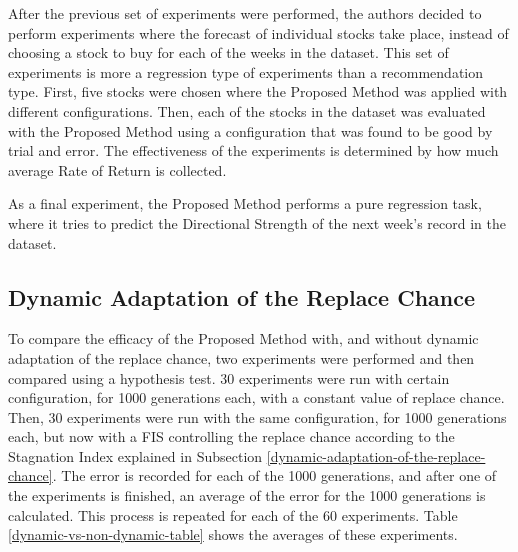 \documentclass[12pt,journal,draftcls,onecolumn]{IEEEtran}
\begin{document}
After the previous set of experiments were performed, the authors decided to perform experiments where the forecast of individual stocks take place, instead of choosing a stock to buy for each of the weeks in the dataset. This set of experiments is more a regression type of experiments than a recommendation type. First, five stocks were chosen where the Proposed Method was applied with different configurations. Then, each of the stocks in the dataset was evaluated with the Proposed Method using a configuration that was found to be good by trial and error. The effectiveness of the experiments is determined by how much average Rate of Return is collected.

As a final experiment, the Proposed Method performs a pure regression task, where it tries to predict the Directional Strength of the next week's record in the dataset.

\subsection{Dynamic Adaptation of the Replace Chance}

To compare the efficacy of the Proposed Method with, and without dynamic adaptation of the replace chance, two experiments were performed and then compared using a hypothesis test. 30 experiments were run with certain configuration, for 1000 generations each, with a constant value of replace chance. Then, 30 experiments were run with the same configuration, for 1000 generations each, but now with a FIS controlling the replace chance according to the Stagnation Index explained in Subsection \ref{dynamic-adaptation-of-the-replace-chance}. The error is recorded for each of the 1000 generations, and after one of the experiments is finished, an average of the error for the 1000 generations is calculated. This process is repeated for each of the 60 experiments. Table \ref{dynamic-vs-non-dynamic-table} shows the averages of these experiments.
\end{document}

